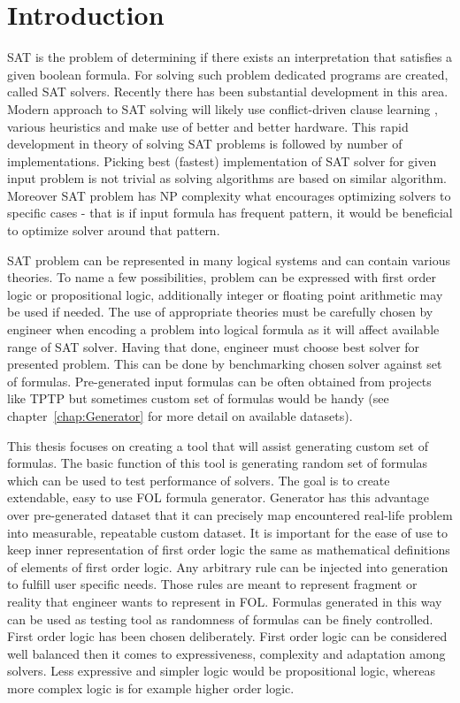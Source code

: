 \chapter{Introduction} \label{cha:Introduction}

\gls{SAT} is the problem of determining if there exists an interpretation that satisfies a given boolean formula. For solving such problem dedicated programs are created, called SAT solvers. Recently there has been substantial development in this area. Modern approach to SAT solving will likely use conflict-driven clause learning \cite{series/faia/SilvaLM09}, various heuristics and make use of better and better hardware. This rapid development in theory of solving SAT problems is followed by number of implementations. Picking best (fastest) implementation of SAT solver for given input problem is not trivial as solving algorithms are based on similar algorithm. Moreover SAT problem has NP complexity what encourages optimizing solvers to specific cases - that is if input formula has frequent pattern, it would be beneficial to optimize solver around that pattern.

SAT problem can be represented in many logical systems and can contain various theories. To name a few possibilities, problem can be expressed with first order logic or propositional logic, additionally integer or floating point arithmetic may be used if needed. The use of appropriate theories must be carefully chosen by engineer when encoding a problem into logical formula as it will affect available range of SAT solver. Having that done, engineer must choose best solver for presented problem. This can be done by benchmarking chosen solver against set of formulas. Pre-generated input formulas can be often obtained from projects like \gls{TPTP} but sometimes custom set of formulas would be handy (see chapter~\ref{chap:Generator} for more detail on available datasets).

This thesis focuses on creating a tool that will assist generating custom set of formulas. The basic function of this tool is generating random set of formulas which can be used to test performance of solvers. 
The goal is to create extendable, easy to use \gls{FOL} formula generator.
Generator has this advantage over pre-generated dataset that it can precisely map encountered real-life problem into measurable, repeatable custom dataset. It is important for the ease of use to keep inner representation of first order logic the same as mathematical definitions of elements of first order logic. Any arbitrary rule can be injected into generation to fulfill user specific needs. Those rules are meant to represent fragment or reality that engineer wants to represent in \gls{FOL}. Formulas generated in this way can be used as testing tool as randomness of formulas can be finely controlled. 
First order logic has been chosen deliberately. First order logic can be considered well balanced then it comes to expressiveness, complexity and adaptation among solvers. Less expressive and simpler logic would be propositional logic, whereas more complex logic is for example higher order logic. 

